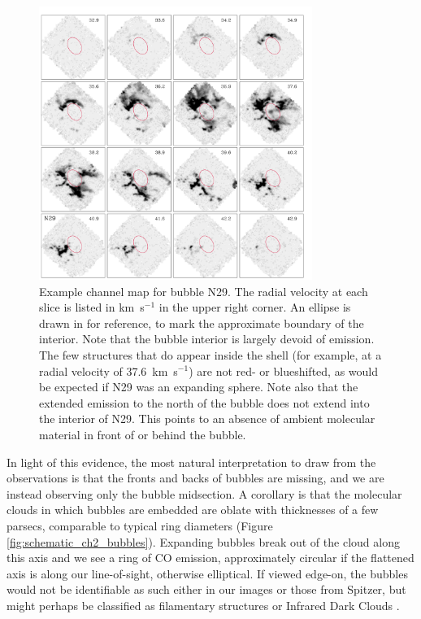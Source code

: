 \begin{figure}
\includegraphics[width=3.5in, angle=0]{channel029}
\caption{Example channel map for bubble N29. The radial velocity at each slice is listed in km\, s$^{-1}$ in the upper right corner.
An ellipse is drawn in for reference, to mark the approximate boundary of the interior.
Note that the bubble interior is largely devoid of emission. The few structures that do appear inside the shell (for example,
at a radial velocity of 37.6~km~s$^{-1}$) are not red- or blueshifted, as would be expected if N29 was an expanding sphere.
Note also that the extended emission to the north of the bubble does not extend into the interior of N29. This points to
an absence of ambient molecular material in front of or behind the bubble.}
\label{fig:channelmap}
\end{figure}



In light of this evidence, the most natural interpretation to draw from the observations
is that the fronts and backs of bubbles are missing,
and we are instead observing only the bubble midsection.
A corollary is that the molecular clouds in which bubbles are
embedded are oblate with thicknesses
of a few parsecs, comparable to typical ring diameters (Figure \ref{fig:schematic_ch2_bubbles}).
Expanding bubbles break out of the cloud along this axis
and we see a ring of CO emission, approximately circular if
the flattened axis is along our line-of-sight, otherwise
elliptical. If viewed edge-on, the bubbles would not be identifiable
as such either in our images or those from Spitzer, but might
perhaps be classified as filamentary structures or Infrared Dark Clouds \citep{Simon06, Jackson08}.



